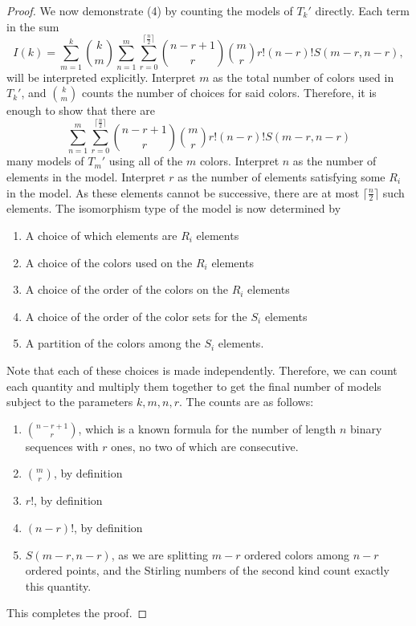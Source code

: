 \documentclass[10pt,a4paper]{amsart}
\begin{document}
\begin{proof}
    We now demonstrate (4) by counting the models of $T_k'$ directly.
    Each term in the sum
    \[I(k)=\sum_{m=1}^k{k \choose m}\sum_{n=1}^m\sum_{r=0}^{\lceil \frac{n}2 \rceil}{n-r+1 \choose r}{m \choose r}r!(n-r)!S(m-r,n-r),\]
    will be interpreted explicitly.
    Interpret $m$ as the total number of colors used in $T_k'$, and ${k \choose m}$ counts the number of choices for said colors.
    Therefore, it is enough to show that there are
    \[\sum_{n=1}^m\sum_{r=0}^{\lceil \frac{n}2 \rceil}{n-r+1 \choose r}{m \choose r}r!(n-r)!S(m-r,n-r)\]
    many models of $T_m'$ using all of the $m$ colors.
    Interpret $n$ as the number of elements in the model.
    Interpret $r$ as the number of elements satisfying some $R_i$ in the model.
    As these elements cannot be successive, there are at most $\lceil \frac{n}2 \rceil$ such elements.
    The isomorphism type of the model is now determined by
    \begin{enumerate}
        \item A choice of which elements are $R_i$ elements
        \item A choice of the colors used on the $R_i$ elements
        \item A choice of the order of the colors on the $R_i$ elements
        \item A choice of the order of the color sets for the $S_i$ elements
        \item A partition of the colors among the $S_i$ elements.
    \end{enumerate}
    Note that each of these choices is made independently.
    Therefore, we can count each quantity and multiply them together to get the final number of models subject to the parameters $k,m,n,r$.
    The counts are as follows:
    \begin{enumerate}
        \item ${n-r+1 \choose r}$, which is a known formula for the number of length $n$ binary sequences with $r$ ones, no two of which are consecutive.
        \item ${m \choose r}$, by definition
        \item $r!$, by definition
        \item $(n-r)!$, by definition
        \item $S(m-r,n-r)$, as we are splitting $m-r$ ordered colors among $n-r$ ordered points, and the Stirling numbers of the second kind count exactly this quantity.
    \end{enumerate}
    This completes the proof.
\end{proof}
\end{document}
